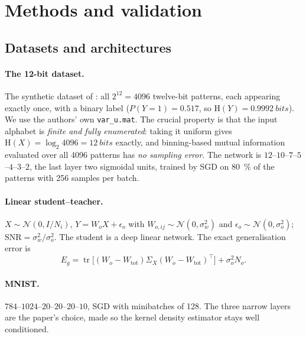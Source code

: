 \documentclass[11pt,a4paper]{article}
\newcommand{\HH}{\mathrm{H}}
\newcommand{\Norm}{\mathcal{N}}
\DeclareMathOperator{\tr}{tr}
\begin{document}
\section{Methods and validation}

\subsection{Datasets and architectures}

\paragraph{The 12-bit dataset.} The synthetic dataset of
\citet{shwartzziv2017opening}: all $2^{12}=4096$ twelve-bit patterns, each
appearing exactly once, with a binary label ($P(Y{=}1)=0.517$, so
$\HH(Y)=\SI{0.9992}{bits}$). We use the authors' own \texttt{var\_u.mat}. The
crucial property is that the input alphabet is \emph{finite and fully
enumerated}: taking it uniform gives $\HH(X)=\log_2 4096 = \SI{12}{bits}$
exactly, and binning-based mutual information evaluated over all 4096 patterns
has \emph{no sampling error}. The network is
$12$--$10$--$7$--$5$--$4$--$3$--$2$, the last layer two sigmoidal units, trained
by SGD on \SI{80}{\percent} of the patterns with 256 samples per batch.

\paragraph{Linear student--teacher.} $X\sim\Norm(0,I/N_i)$,
$Y = W_o X + \epsilon_o$ with $W_{o,ij}\sim\Norm(0,\sigma_w^2)$ and
$\epsilon_o\sim\Norm(0,\sigma_o^2)$; $\mathrm{SNR}=\sigma_w^2/\sigma_o^2$. The
student is a deep linear network. The exact generalisation error is
\begin{equation}
  E_g = \tr\!\big[(W_o-W_{\mathrm{tot}})\Sigma_X(W_o-W_{\mathrm{tot}})^\top\big]
        + \sigma_o^2 N_o .
  \label{eq:eg}
\end{equation}

\paragraph{MNIST.} $784$--$1024$--$20$--$20$--$20$--$10$, SGD with minibatches of
128. The three narrow layers are the paper's choice, made so the kernel density
estimator stays well conditioned.
\end{document}
